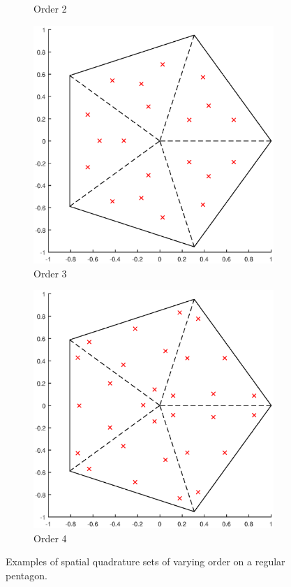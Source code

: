 \begin{figure}
{\begin{subfigure}[b]{0.475\textwidth}
		\caption{Order 2}
	\end{subfigure}
}
\vspace{3mm}
{
	\begin{subfigure}[b]{0.475\textwidth}
		\centering
		\label{subfig::2DInt_V5_Q3}
		\includegraphics[width=\textwidth]{figures/sec_BF/V5_Q3.eps}
		\caption{Order 3}
	\end{subfigure}
	\hfill
	\begin{subfigure}[b]{0.475\textwidth}
		\centering
		\label{subfig::2DInt_V5_Q4}
		\includegraphics[width=\textwidth]{figures/sec_BF/V5_Q4.eps}
		\caption{Order 4}
	\end{subfigure}
}
\caption{Examples of spatial quadrature sets of varying order on a regular pentagon.}
\label{fig::BF_2DIntegration_Pentagon}
\end{figure}


